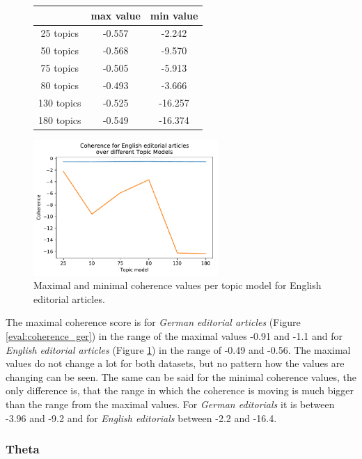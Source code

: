 \begin{figure}
	\begin{minipage}[t]{0.5\textwidth}
		\centering
		\begin{tabular}{c|cc}
			&max value & min value\\
			\hline
			25 topics&-0.557&-2.242\\
			50 topics&-0.568&-9.570\\
			75 topics&-0.505&-5.913\\
			80 topics&	-0.493&-3.666\\
			130 topics &-0.525&-16.257\\
			180 topics&	-0.549&-16.374\\
		\end{tabular}
	\end{minipage}%
	\begin{minipage}{0.5\textwidth}
		\centering
		\includegraphics[width=7cm]{gfx/Eval_IC/English_Editorial_Coherence.pdf}
	\end{minipage}
	\caption[]{Maximal and minimal coherence values per topic model for English editorial articles.}
	\label{eval:coherence_en}
\end{figure}
The maximal coherence score is for \textit{German editorial articles} (Figure \ref{eval:coherence_ger}) in the range of the maximal values -0.91 and -1.1 and for \textit{English editorial articles} (Figure \ref{eval:coherence_en}) in the range of -0.49 and -0.56. The maximal values do not change a lot for both datasets, but no pattern how the values are changing can be seen. The same can be said for the minimal coherence values, the only difference is, that the range in which the coherence is moving is much bigger than the range from the maximal values. For \textit{German editorials} it is between -3.96 and -9.2 and for \textit{English editorials} between -2.2 and -16.4.

\subsubsection{Theta}

